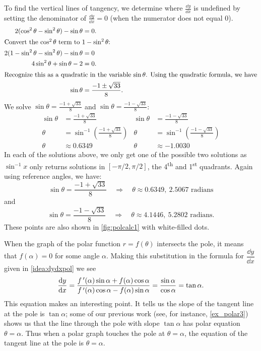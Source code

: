 \begin{example}
\begin{enumerate}
To find the vertical lines of tangency, we determine where $\frac{\dd y}{\dd x}$ is undefined by setting the denominator of $\frac{\dd y}{\dd x}=0$ (when the numerator does not equal 0).
\begin{align*}
2(\cos^2\theta -\sin^2\theta)-\sin\theta &= 0 .\\
\intertext{Convert the \(\cos^2\theta\) term to \(1-\sin^2\theta\):}
2(1-\sin^2\theta-\sin^2\theta)-\sin\theta &= 0\\
4\sin^2\theta + \sin\theta -2 &= 0.\\
\intertext{Recognize this as a quadratic in the variable \(\sin\theta\). Using the quadratic formula, we have}
\sin\theta &= \frac{-1\pm\sqrt{33}}{8}.
\end{align*}
We solve $\sin\theta = \frac{-1+\sqrt{33}}8$ and $\sin\theta = \frac{-1-\sqrt{33}}8$:
\begin{align*}
\sin\theta &=\frac{-1+\sqrt{33}}8 & \sin\theta &= \frac{-1-\sqrt{33}}{8}\\
\theta &= \sin^{-1}\left(\frac{-1+\sqrt{33}}8\right) & \theta &= \sin^{-1}\left(\frac{-1-\sqrt{33}}8\right)\\
\theta &\approx 0.6349 & \theta &\approx -1.0030
\end{align*}
In each of the solutions above, we only get one of the possible two solutions as $\sin^{-1}x$ only returns solutions in $[-\pi/2,\pi/2]$, the 4\textsuperscript{th} and 1\textsuperscript{st} quadrants. Again using reference angles, we have:
\[
\sin\theta = \frac{-1+\sqrt{33}}8 \quad \Rightarrow \quad
\theta \approx 0.6349,\ 2.5067 \text{ radians}
\]
and 
\[
\sin\theta = \frac{-1-\sqrt{33}}8 \quad \Rightarrow \quad
\theta \approx 4.1446,\ 5.2802 \text{ radians.}
\]
These points are also shown in \autoref{fig:polcalc1} with white-filled dots.
\end{enumerate}
\end{example}

When the graph of the polar function $r=f(\theta)$ intersects the pole, it means that $f(\alpha) = 0$ for some angle $\alpha$. Making this substitution in the formula for $\dfrac{\dd y}{\dd x}$ given in \autoref{idea:dydxpol} we see
\[
 \frac{\operatorname{d}\! y}{\operatorname{d}\! x}
 =\frac{f\,'(\alpha)\sin\alpha+f(\alpha)\cos\alpha}{f\,'(\alpha)\cos\alpha-f(\alpha)\sin\alpha}
 =\frac{\sin\alpha}{\cos\alpha}
 =\tan\alpha.
\]
%
This equation makes an interesting point. It tells us the slope of the tangent line at the pole is $\tan \alpha$; some of our previous work (see, for instance, \autoref{ex_polar3}) shows us that the line through the pole with slope $\tan \alpha$ has polar equation $\theta=\alpha$. Thus when a polar graph touches the pole at $\theta=\alpha$, the equation of the tangent line at the pole is $\theta=\alpha$.


